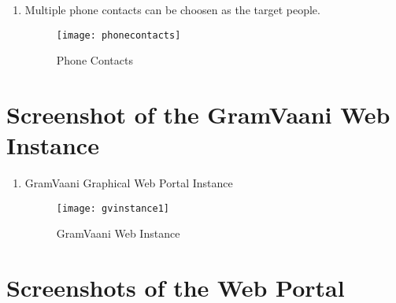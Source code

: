 \begin {enumerate}
\item Multiple phone contacts can be choosen as the target people.
\begin{figure}[here]
\begin{center}   
\texttt{[image: phonecontacts]}
\caption{Phone Contacts}
\label{fig:phonecontacts}
\end{center}
\end{figure}

\end{enumerate}

\section{Screenshot of the GramVaani Web Instance}

\begin{enumerate}

\item GramVaani Graphical Web Portal Instance
\begin{figure}[here]
\begin{center}   
\texttt{[image: gvinstance1]}
\caption{GramVaani Web Instance}
\label{fig:gvinstance1}
\end{center}
\end{figure}


\end{enumerate}




\section{Screenshots of the Web Portal}

